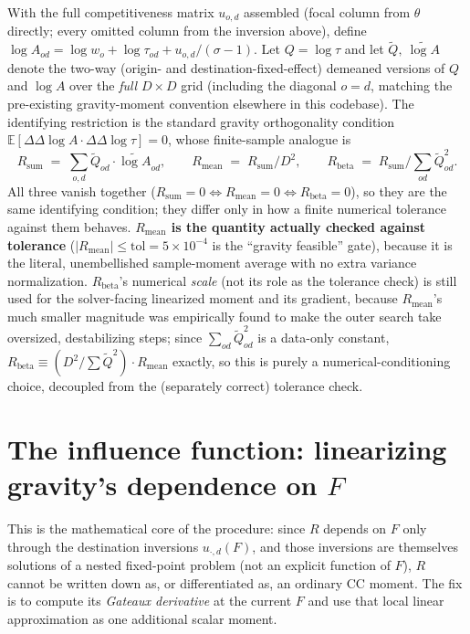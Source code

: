 \documentclass[11pt]{article}
\newcommand{\E}{\mathbb{E}}
\begin{document}
With the full competitiveness matrix $u_{o,d}$ assembled (focal column from $\theta$ directly;
every omitted column from the inversion above), define $\log A_{od} = \log w_o + \log\tau_{od} +
u_{o,d}/(\sigma-1)$. Let $Q=\log\tau$ and let $\tilde Q,\ \widetilde{\log A}$ denote the two-way
(origin- and destination-fixed-effect) demeaned versions of $Q$ and $\log A$ over the \emph{full}
$D\times D$ grid (including the diagonal $o=d$, matching the pre-existing gravity-moment convention
elsewhere in this codebase). The identifying restriction is the standard gravity orthogonality
condition $\E[\Delta\Delta\log A\cdot\Delta\Delta\log\tau]=0$, whose finite-sample analogue is
\[
R_{\mathrm{sum}} \;=\; \sum_{o,d}\tilde Q_{od}\cdot\widetilde{\log A}_{od}, \qquad
R_{\mathrm{mean}} \;=\; R_{\mathrm{sum}}/D^2, \qquad
R_{\mathrm{beta}} \;=\; R_{\mathrm{sum}}\big/\textstyle\sum_{od}\tilde Q_{od}^2.
\]
All three vanish together ($R_{\mathrm{sum}}=0\iff R_{\mathrm{mean}}=0\iff R_{\mathrm{beta}}=0$), so
they are the same identifying condition; they differ only in how a finite numerical tolerance
against them behaves. \textbf{$R_{\mathrm{mean}}$ is the quantity actually checked against
tolerance} ($|R_{\mathrm{mean}}|\le\mathrm{tol}=5\times10^{-4}$ is the ``gravity feasible'' gate),
because it is the literal, unembellished sample-moment average with no extra variance
normalization. $R_{\mathrm{beta}}$'s numerical \emph{scale} (not its role as the tolerance check) is
still used for the solver-facing linearized moment and its gradient, because $R_{\mathrm{mean}}$'s
much smaller magnitude was empirically found to make the outer search take oversized, destabilizing
steps; since $\sum_{od}\tilde Q_{od}^2$ is a data-only constant, $R_{\mathrm{beta}}\equiv
(D^2/\textstyle\sum\tilde Q^2)\cdot R_{\mathrm{mean}}$ exactly, so this is purely a numerical-conditioning
choice, decoupled from the (separately correct) tolerance check.

\section{The influence function: linearizing gravity's dependence on $F$}
\label{sec:influence}

This is the mathematical core of the procedure: since $R$ depends on $F$ only through the
destination inversions $u_{\cdot,d}(F)$, and those inversions are themselves solutions of a nested
fixed-point problem (not an explicit function of $F$), $R$ cannot be written down as, or
differentiated as, an ordinary CC moment. The fix is to compute its \emph{Gateaux derivative} at
the current $F$ and use that local linear approximation as one additional scalar moment.
\end{document}
